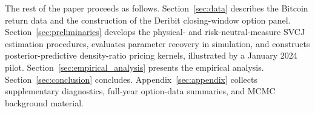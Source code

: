The rest of the paper proceeds as follows. Section~\ref{sec:data} describes the Bitcoin return data and the construction of the Deribit closing-window option panel. Section~\ref{sec:preliminaries} develops the physical- and risk-neutral-measure SVCJ estimation procedures, evaluates parameter recovery in simulation, and constructs posterior-predictive density-ratio pricing kernels, illustrated by a January 2024 pilot. Section~\ref{sec:empirical_analysis} presents the empirical analysis. Section~\ref{sec:conclusion} concludes. Appendix~\ref{sec:appendix} collects supplementary diagnostics, full-year option-data summaries, and MCMC background material.

